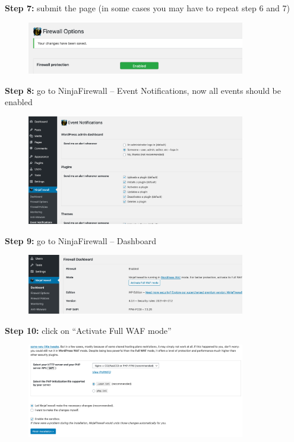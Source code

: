 \documentclass[a4paper]{article}
\begin{document}
\noindent
\textbf{Step 7:} submit the page (in some cases you may have to repeat step 6 and 7)

\begin{figure}[H]
  \centering
  \includegraphics[width=0.85\textwidth]{images/8.png}
\end{figure}

\noindent
\textbf{Step 8:} go to NinjaFirewall -- Event Notifications, now all events should be enabled

\begin{figure}[H]
  \centering
  \includegraphics[width=0.85\textwidth]{images/9.png}
\end{figure}

\newpage

\noindent
\textbf{Step 9:} go to NinjaFirewall -- Dashboard

\begin{figure}[H]
  \centering
  \includegraphics[width=0.85\textwidth]{images/10.png}
\end{figure}

\noindent
\textbf{Step 10:} click on \enquote{Activate Full WAF mode}

\begin{figure}[H]
  \centering
  \includegraphics[width=0.85\textwidth]{images/11.png}
\end{figure}
\end{document}
